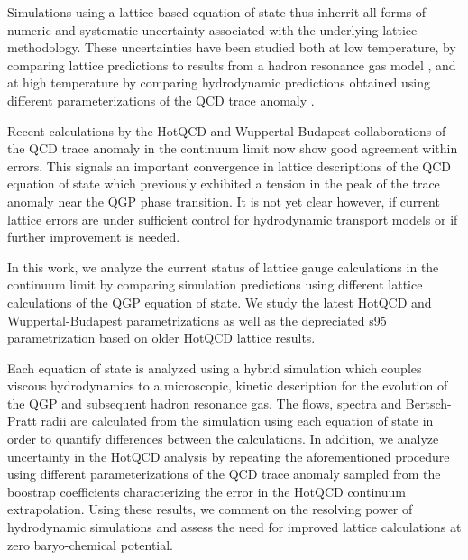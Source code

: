 \documentclass[aps,prc,reprint,amsmath,nofootinbib,superscriptaddress]{revtex4-1}
\begin{document}
Simulations using a lattice based equation of state thus inherrit all forms of numeric and systematic uncertainty associated 
with the underlying lattice methodology. These uncertainties have been studied both at low temperature, by comparing lattice predictions to results from a hadron 
resonance gas model \cite{Huovinen:2009yb}, and at high temperature by comparing hydrodynamic predictions obtained using different 
parameterizations of the QCD trace anomaly \cite{Huovinen:2005gy, Huovinen:2009yb}. 


Recent calculations by the HotQCD and Wuppertal-Budapest collaborations of the QCD trace anomaly in the continuum limit now show good agreement 
within errors. This signals an important convergence in lattice descriptions of the QCD equation of state which previously exhibited a tension 
in the peak of the trace anomaly near the QGP phase transition. It is not yet clear however, if current lattice errors are under sufficient 
control for hydrodynamic transport models or if further improvement is needed.  

In this work, we analyze the current status of lattice gauge calculations in the continuum limit by comparing simulation predictions using 
different lattice calculations of the QGP equation of state. We study the latest HotQCD and Wuppertal-Budapest parametrizations as well as 
the depreciated s95 parametrization based on older HotQCD lattice results. 

Each equation of state is analyzed using a hybrid simulation which couples viscous hydrodynamics to a microscopic, kinetic description for the evolution of the QGP and subsequent hadron resonance gas. The flows, spectra and Bertsch-Pratt radii are calculated from the
simulation using each equation of state in order to quantify differences between the calculations. In addition, we analyze uncertainty
in the HotQCD analysis by repeating the aforementioned procedure using different parameterizations of the QCD trace anomaly sampled from
the boostrap coefficients characterizing the error in the HotQCD continuum extrapolation. Using these results, we comment on the resolving 
power of hydrodynamic simulations and assess the need for improved lattice calculations at zero baryo-chemical potential.
\end{document}
